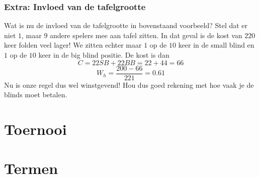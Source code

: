 \documentclass{article}
\begin{document}
    \subsubsection{Extra: Invloed van de tafelgrootte}

        Wat is nu de invloed van de tafelgrootte in bovenstaand voorbeeld? Stel dat er niet $1$, maar $9$ andere spelers mee aan tafel zitten. In dat geval is de kost van $220$ keer folden veel lager! We zitten echter maar $1$ op de $10$ keer in de small blind en $1$ op de $10$ keer in de big blind positie. De kost is dan
        $$C = 22SB + 22BB = 22+44 = 66$$
        $$W_h = \frac{200 - 66}{221} = 0.61$$
        Nu is onze regel dus wel winstgevend! Hou dus goed rekening met hoe vaak je de blinds moet betalen.
    
    
\section{Toernooi}

\section{Termen}
\end{document}
